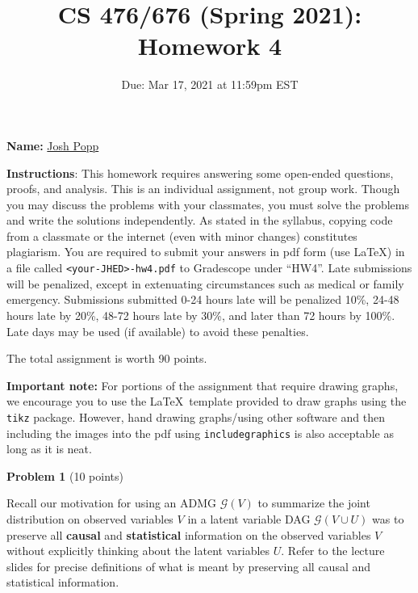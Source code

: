 \documentclass[letterpaper, 11pt]{article}
\title{CS 476/676 (Spring 2021): Homework 4}
\author{}
\date{Due: Mar 17, 2021 at 11:59pm EST}
\newcommand{\G}{\mathcal{G}}
\begin{document}
\maketitle

\setlength{\parindent}{0em}
\setlength{\parskip}{0.8em}

\large\textbf{Name:} \underline{\hspace{30pt} \color{blue} Josh Popp \hspace{30pt}}
\vspace{1em}

	\textbf{Instructions}: This homework requires answering some open-ended questions, proofs, and analysis. This is an individual assignment, not group work. Though you may discuss the problems with your classmates, you must solve the problems and write the solutions independently. As stated in the syllabus, copying code
	from a classmate or the internet (even with minor changes) constitutes plagiarism. You are required to submit your answers in pdf form (use \LaTeX) in a file called \texttt{<your-JHED>-hw4.pdf} to Gradescope under ``HW4''.
	Late submissions will be penalized, except in extenuating circumstances such
	as medical or family emergency. Submissions submitted 0-24 hours late will be
	penalized 10\%, 24-48 hours late by 20\%, 48-72 hours late by 30\%, and later
    than 72 hours by 100\%. Late days may be used (if available) to avoid these penalties.

    The total assignment is worth 90 points.

    \textbf{Important note:} For  portions of the assignment that require drawing graphs, we  encourage you to use the \LaTeX\  template provided to draw graphs using the \texttt{tikz} package. However, hand drawing graphs/using other software and then including the images into the pdf using \texttt{includegraphics} is also acceptable as long as it is neat.



\vspace{2em}

{\large\textbf{Problem 1}} (10 points)

Recall our motivation for using an ADMG $\G(V)$ to summarize the joint distribution on observed variables $V$ in a latent variable DAG $\G(V \cup U)$ was to preserve all \textbf{causal} and \textbf{statistical} information on the observed variables $V$ without explicitly thinking about the latent variables $U$. Refer to the lecture slides for precise definitions of what is meant by preserving all causal and statistical information.
\end{document}
